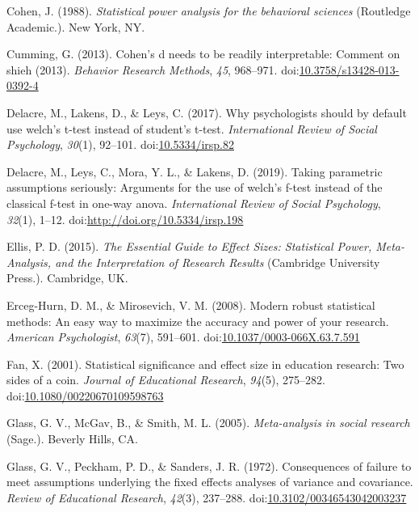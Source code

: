 \documentclass[
  man,floatsintext]{apa6}
\begin{document}
\leavevmode\hypertarget{ref-Cohen_1988}{}%
Cohen, J. (1988). \emph{Statistical power analysis for the behavioral sciences} (Routledge Academic.). New York, NY.

\leavevmode\hypertarget{ref-Cumming_2013}{}%
Cumming, G. (2013). Cohen's d needs to be readily interpretable: Comment on shieh (2013). \emph{Behavior Research Methods}, \emph{45}, 968--971. doi:\href{https://doi.org/10.3758/s13428-013-0392-4}{10.3758/s13428-013-0392-4}

\leavevmode\hypertarget{ref-Delacre_et_al_2017}{}%
Delacre, M., Lakens, D., \& Leys, C. (2017). Why psychologists should by default use welch's t-test instead of student's t-test. \emph{International Review of Social Psychology}, \emph{30}(1), 92--101. doi:\href{https://doi.org/10.5334/irsp.82}{10.5334/irsp.82}

\leavevmode\hypertarget{ref-Delacre_et_al_2019}{}%
Delacre, M., Leys, C., Mora, Y. L., \& Lakens, D. (2019). Taking parametric assumptions seriously: Arguments for the use of welch's f-test instead of the classical f-test in one-way anova. \emph{International Review of Social Psychology}, \emph{32}(1), 1--12. doi:\href{https://doi.org/http://doi.org/10.5334/irsp.198}{http://doi.org/10.5334/irsp.198}

\leavevmode\hypertarget{ref-Ellis_2015}{}%
Ellis, P. D. (2015). \emph{The Essential Guide to Effect Sizes: Statistical Power, Meta-Analysis, and the Interpretation of Research Results} (Cambridge University Press.). Cambridge, UK.

\leavevmode\hypertarget{ref-Erceg-Hurn_Mirosevich_2008}{}%
Erceg-Hurn, D. M., \& Mirosevich, V. M. (2008). Modern robust statistical methods: An easy way to maximize the accuracy and power of your research. \emph{American Psychologist}, \emph{63}(7), 591--601. doi:\href{https://doi.org/10.1037/0003-066X.63.7.591}{10.1037/0003-066X.63.7.591}

\leavevmode\hypertarget{ref-Fan_2001}{}%
Fan, X. (2001). Statistical significance and effect size in education research: Two sides of a coin. \emph{Journal of Educational Research}, \emph{94}(5), 275--282. doi:\href{https://doi.org/10.1080/00220670109598763}{10.1080/00220670109598763}

\leavevmode\hypertarget{ref-Glass_et_al_1981}{}%
Glass, G. V., McGav, B., \& Smith, M. L. (2005). \emph{Meta-analysis in social research} (Sage.). Beverly Hills, CA.

\leavevmode\hypertarget{ref-Glass_et_al_1972}{}%
Glass, G. V., Peckham, P. D., \& Sanders, J. R. (1972). Consequences of failure to meet assumptions underlying the fixed effects analyses of variance and covariance. \emph{Review of Educational Research}, \emph{42}(3), 237--288. doi:\href{https://doi.org/10.3102/00346543042003237}{10.3102/00346543042003237}
\end{document}
